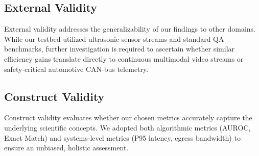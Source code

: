 \subsection{External Validity}
External validity addresses the generalizability of our findings to other domains. While our testbed utilized ultrasonic sensor streams and standard QA benchmarks, further investigation is required to ascertain whether similar efficiency gains translate directly to continuous multimodal video streams or safety-critical automotive CAN-bus telemetry.

\subsection{Construct Validity}
Construct validity evaluates whether our chosen metrics accurately capture the underlying scientific concepts. We adopted both algorithmic metrics (AUROC, Exact Match) and systems-level metrics (P95 latency, egress bandwidth) to ensure an unbiased, holistic assessment.
